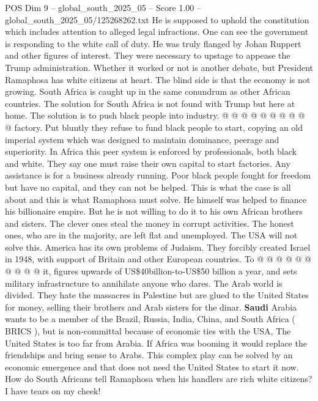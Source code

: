\begin{textsample}{POS Dim 9 – global\_south\_2025\_05 – Score 1.00 – global\_south\_2025\_05/125268262.txt}
He is supposed to uphold the constitution which includes attention to alleged legal infractions.
One can see the government is responding to the white call of duty.
He was truly flanged by Johan Ruppert and other figures of interest.
They were necessary to upstage to appease the Trump administration.
Whether it worked or not is another debate, but President Ramaphosa has white citizens at heart.
The blind side is that the economy is not growing.
South Africa is caught up in the same conundrum as other African countries.
The solution for South Africa is not found with Trump but here at home.
The solution is to push black people into industry. @ @ @ @ @ @ @ @ @ @ factory.
Put bluntly they refuse to fund black people to start, copying an old imperial system which was designed to maintain dominance, peerage and superiority.
In Africa this peer system is enforced by professionals, both black and white.
They say one must raise their own capital to start factories.
Any assistance is for a business already running.
Poor black people fought for freedom but have no capital, and they can not be helped.
This is what the case is all about and this is what Ramaphosa must solve.
He himself was helped to finance his billionaire empire.
But he is not willing to do it to his own African brothers and sisters.
The clever ones steal the money in corrupt activities.
The honest ones, who are in the majority, are left flat and unemployed.
The USA will not solve this.
America has its own problems of Judaism.
They forcibly created Israel in 1948, with support of Britain and other European countries.
To @ @ @ @ @ @ @ @ @ @ it, figures upwards of US\$40billion-to-US\$50 billion a year, and sets military infrastructure to annihilate anyone who dares.
The Arab world is divided.
They hate the massacres in Palestine but are glued to the United States for money, selling their brothers and Arab sisters for the dinar. \textbf{Saudi} Arabia wants to be a member of the Brazil, Russia, India, China, and South Africa ( BRICS ), but is non-committal because of economic ties with the USA, The United States is too far from Arabia.
If Africa was booming it would replace the friendships and bring sense to Arabs.
This complex play can be solved by an economic emergence and that does not need the United States to start it now.
How do South Africans tell Ramaphosa when his handlers are rich white citizens?
I have tears on my cheek!

\end{textsample}
